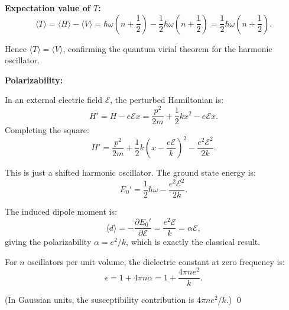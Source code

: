 \documentclass[12pt]{article}
\begin{document}
\textbf{Expectation value of $T$:}
\[
\langle T\rangle = \langle H\rangle - \langle V\rangle = \hbar\omega\left(n+\frac{1}{2}\right) - \frac{1}{2}\hbar\omega\left(n+\frac{1}{2}\right) = \frac{1}{2}\hbar\omega\left(n+\frac{1}{2}\right).
\]

Hence $\langle T\rangle = \langle V\rangle$, confirming the quantum virial theorem for the harmonic oscillator.

\bigskip
\textbf{Polarizability:}

In an external electric field $\mathcal{E}$, the perturbed Hamiltonian is:
\[
H' = H - e\mathcal{E}x = \frac{p^2}{2m} + \frac{1}{2}kx^2 - e\mathcal{E}x.
\]
Completing the square:
\[
H' = \frac{p^2}{2m} + \frac{1}{2}k\left(x - \frac{e\mathcal{E}}{k}\right)^2 - \frac{e^2\mathcal{E}^2}{2k}.
\]

This is just a shifted harmonic oscillator. The ground state energy is:
\[
E_0' = \frac{1}{2}\hbar\omega - \frac{e^2\mathcal{E}^2}{2k}.
\]

The induced dipole moment is:
\[
\langle d \rangle = -\frac{\partial E_0'}{\partial \mathcal{E}} = \frac{e^2\mathcal{E}}{k} = \alpha\mathcal{E},
\]
giving the polarizability $\alpha = e^2/k$, which is exactly the classical result.

For $n$ oscillators per unit volume, the dielectric constant at zero frequency is:
\[
\epsilon = 1 + 4\pi n\alpha = 1 + \frac{4\pi n e^2}{k}.
\]

(In Gaussian units, the susceptibility contribution is $4\pi n e^2/k$.) \qed
\end{document}
